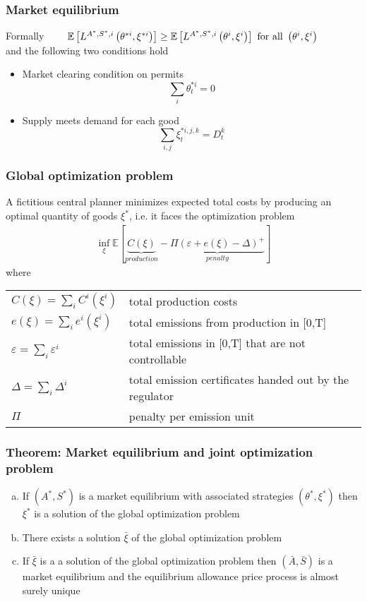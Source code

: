 \begin{frame}
\frametitle{Market equilibrium}
Formally
$
\qquad \mathbb{E}\left[ L^{A^*, S^*, i}\left(\theta^{*i},\xi^{*i}\right) \right] \ge \mathbb{E}\left[ L^{A^*, S^*, i}\left(\theta^{i},\xi^{i}\right) \right] \textnormal{ for all } \left(\theta^i, \xi^i \right)
$ \\
and the following two conditions hold
\begin{itemize}
\item<1-> Market clearing condition on permits
$$
\sum_{i} \theta^{*i}_t = 0
$$
\item<2-> Supply meets demand for each good
$$
\sum_{i, j} \xi^{*i,j,k}_t = D_t^k
$$
\end{itemize}
\end{frame}


\begin{frame}
\frametitle{Global optimization problem}
A fictitious central planner minimizes expected total costs by producing an optimal quantity of goods $\xi^*$, i.e. it faces the optimization problem
\begin{align}
\inf_{\xi} \mathbb{E} \left[ \underbrace{C(\xi)}_{production} - \underbrace{\Pi \left(\varepsilon + e(\xi) - \Delta \right)^+}_{penalty} \right]
\end{align}
where \\
\begin{tabular}{ll}
$C(\xi) =  \sum_{i} C^i(\xi^i)$ & total production costs\\
$e(\xi) = \sum_{i} e^i(\xi^i)$ & total emissions from production in [0,T] \\
$\varepsilon = \sum_{i} \varepsilon^i$ & total emissions in [0,T] that are not controllable \\
$\Delta = \sum_{i} \Delta^i$ & total emission certificates handed out by the regulator \\
$\Pi$ & penalty per emission unit \\
\end{tabular}

\end{frame}


\begin{frame}
\frametitle{Theorem: Market equilibrium and joint optimization problem}
\begin{enumerate}[(a)]
\item If $(A^*,S^*)$ is a market equilibrium with associated strategies $(\theta^*,\xi^*)$ then $\xi^*$ is a solution of the global optimization problem
\item There exists a solution $\bar{\xi}$ of the global optimization problem
\item If $\bar{\xi}$ is a a solution of the global optimization problem then $(\bar{A}, \bar{S})$ is a market equilibrium and the equilibrium allowance price process is almost surely unique
\end{enumerate}
\end{frame}


